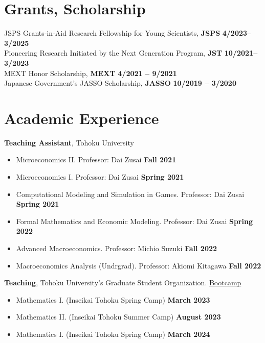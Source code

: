 \documentclass[margin,line]{res}
\begin{document}
\begin{resume}
\vspace{4mm}

\section{\sc Grants, Scholarship}
JSPS Grants-in-Aid Research Fellowship for Young Scientists, {\bf JSPS} \hfill {\bf 4/2023--3/2025}\\
Pioneering Research Initiated by the Next Generation Program, {\bf JST} \hfill {\bf 10/2021--3/2023}\\
MEXT Honor Scholarship, {\bf MEXT} \hfill {\bf 4/2021 -- 9/2021}\\
Japanese Government's JASSO Scholarship, {\bf JASSO} \hfill {\bf 10/2019 -- 3/2020}\\

\vspace{4mm}

\section{\sc Academic Experience}
{\bf Teaching Assistant}, Tohoku University
\begin{itemize}
\item[ ] Microeconomics II. Professor: Dai Zusai \hfill {\bf Fall 2021}
\item[ ] Microeconomics I. Professor: Dai Zusai \hfill {\bf Spring 2021}
\item[ ] Computational Modeling and Simulation in Games. Professor: Dai Zusai \hfill {\bf Spring 2021}
\item[ ] Formal Mathematics and Economic Modeling. Professor: Dai Zusai \hfill {\bf Spring 2022}
\item[ ] Advanced Macroeconomics. Professor: Michio Suzuki \hfill {\bf Fall 2022}
\item[ ] Macroeconomics Analysis (Undrgrad). Professor: Akiomi Kitagawa \hfill {\bf Fall 2022}
\end{itemize}

{\bf Teaching}, Tohoku University's Graduate Student Organization. \href{https://thanhqtran.github.io/tohoku_bootcamp/}{Bootcamp}
\begin{itemize}
\item[ ] Mathematics I. (Inseikai Tohoku Spring Camp) \hfill {\bf March 2023}
\item[ ] Mathematics II. (Inseikai Tohoku Summer Camp) \hfill {\bf August 2023}
\item[ ] Mathematics I. (Inseikai Tohoku Spring Camp) \hfill {\bf March 2024}
\end{itemize}


\end{resume}
\end{document}
